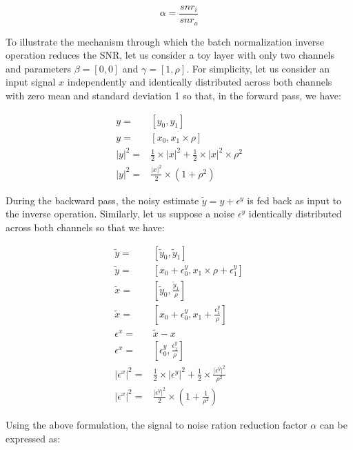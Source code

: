 \documentclass[twocolumn]{bmcart}
\begin{document}
\begin{equation}
\alpha = \frac{snr_i}{snr_o}
\end{equation}

To illustrate the mechanism through which the batch normalization inverse operation reduces the SNR, let us consider a toy layer with only two channels and parameters $\beta=[0,0]$ and $\gamma = [1, \rho]$. For simplicity, let us consider an input signal $x$ independently and identically distributed across both channels with zero mean and standard deviation 1 so that, in the forward pass, we have:

\begin{subequations}
\begin{align}
 y =& [y_0, y_1] \\
 y =& [x_0, x_1 \times \rho] \\
 |y|^2 =& \frac{1}{2} \times |x|^2 + \frac{1}{2} \times |x|^2 \times \rho^2 \\
 |y|^2 =&\frac{|x|^2}{2} \times (1+\rho^2)
\end{align}
\end{subequations}

During the backward pass, the noisy estimate $\tilde{y}=y+\epsilon^y$ is fed back as input to the inverse operation. 
Similarly, let us suppose a noise $\epsilon^y$ identically distributed across both channels so that we have:

\begin{subequations}
\begin{align}
\tilde{y}       =& [ \tilde{y}_0, \tilde{y}_1 ] \\
\tilde{y}       =& [ x_0 + \epsilon_0^y, x_1 \times \rho + \epsilon_1^y ] \\
\tilde{x}       =& [ \tilde{y}_0, \frac{\tilde{y}_1}{\rho}] \\
\tilde{x}       =& [ x_0 + \epsilon_{0}^y, x_1 + \frac{\epsilon_{1}^y}{\rho} ]\\
\epsilon^x      =& \tilde{x} - x\\
\epsilon^x      =& [ \epsilon_0^y, \frac{\epsilon_{1}^y}{\rho} ]\\
|\epsilon^x|^2  =& \frac{1}{2} \times |\epsilon^y|^2 + \frac{1}{2} \times \frac{|\epsilon^y|^2}{\rho^2} \\
|\epsilon^x|^2  =& \frac{|\epsilon^y|^2}{2} \times (1 + \frac{1}{\rho^2})
\end{align}
\end{subequations}

Using the above formulation, the signal to noise ration reduction factor $\alpha$ can be expressed as:
\end{document}
